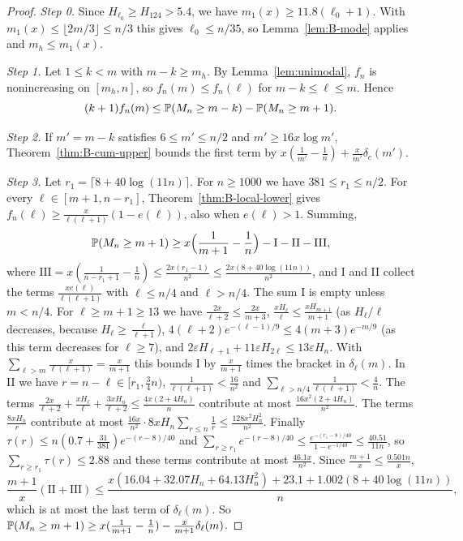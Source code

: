 \begin{proof}
\emph{Step 0.} Since $H_{\ell_0}\ge H_{124}>5.4$, we have
$m_1(x)\ge11.8(\ell_0+1)$. With $m_1(x)\le\lfloor2m/3\rfloor\le n/3$ this
gives $\ell_0\le n/35$, so Lemma~\ref{lem:B-mode} applies and
$m_h\le m_1(x)$.

\emph{Step 1.} Let $1\le k<m$ with $m-k\ge m_h$. By Lemma~\ref{lem:unimodal},
$f_n$ is nonincreasing on $[m_h,n]$, so $f_n(m)\le f_n(\ell)$ for
$m-k\le\ell\le m$. Hence
\[
 (k+1)f_n(m)\le\mathbb{P}(M_n\ge m-k)-\mathbb{P}(M_n\ge m+1).
\]

\emph{Step 2.} If $m'=m-k$ satisfies $6\le m'\le n/2$ and
$m'\ge16x\log m'$, Theorem~\ref{thm:B-cum-upper} bounds the first term by
$x(\frac1{m'}-\frac1n)+\frac x{m'}\delta_c(m')$.

\emph{Step 3.} Let $r_1=\lceil8+40\log(11n)\rceil$. For $n\ge1000$ we have
$381\le r_1\le n/2$. For every $\ell\in[m+1,n-r_1]$,
Theorem~\ref{thm:B-local-lower} gives $f_n(\ell)\ge\frac{x}{\ell(\ell+1)}(1-e(\ell))$,
also when $e(\ell)>1$. Summing,
\[
 \mathbb{P}(M_n\ge m+1)\ge x\Bigl(\frac1{m+1}-\frac1n\Bigr)-\mathrm{I}-\mathrm{II}-\mathrm{III},
\]
where $\mathrm{III}=x(\frac1{n-r_1+1}-\frac1n)\le\frac{2x(r_1-1)}{n^2}\le\frac{2x(8+40\log(11n))}{n^2}$,
and I and II collect the terms $\frac{xe(\ell)}{\ell(\ell+1)}$ with
$\ell\le n/4$ and $\ell>n/4$. The sum I is empty unless $m<n/4$. For
$\ell\ge m+1\ge13$ we have $\frac{2x}{\ell+2}\le\frac{2x}{m+3}$,
$\frac{xH_\ell}\ell\le\frac{xH_{m+1}}{m+1}$ (as $H_\ell/\ell$ decreases,
because $H_\ell\ge\frac\ell{\ell+1}$), $4(\ell+2)e^{-(\ell-1)/9}\le4(m+3)e^{-m/9}$
(as this term decreases for $\ell\ge7$), and
$2\varepsilon H_{\ell+1}+11\varepsilon H_{2\ell}\le13\varepsilon H_n$. With
$\sum_{\ell>m}\frac x{\ell(\ell+1)}=\frac x{m+1}$ this bounds I by
$\frac x{m+1}$ times the bracket in $\delta_\ell(m)$. In II we have
$r=n-\ell\in[r_1,\frac34n)$, $\frac1{\ell(\ell+1)}<\frac{16}{n^2}$ and
$\sum_{\ell>n/4}\frac1{\ell(\ell+1)}<\frac4n$. The terms
$\frac{2x}{\ell+2}+\frac{xH_\ell}\ell+\frac{3xH_n}{\ell+2}\le\frac{4x(2+4H_n)}n$
contribute at most $\frac{16x^2(2+4H_n)}{n^2}$. The terms $\frac{8xH_n}r$
contribute at most $\frac{16x}{n^2}\cdot8xH_n\sum_{r\le n}\frac1r\le\frac{128x^2H_n^2}{n^2}$.
Finally $\tau(r)\le n(0.7+\frac{31}{381})e^{-(r-8)/40}$ and
$\sum_{r\ge r_1}e^{-(r-8)/40}\le\frac{e^{-(r_1-8)/40}}{1-e^{-1/40}}\le\frac{40.51}{11n}$,
so $\sum_{r\ge r_1}\tau(r)\le2.88$ and these terms contribute at most
$\frac{46.1x}{n^2}$. Since $\frac{m+1}x\le\frac{0.501n}x$,
\[
 \frac{m+1}x(\mathrm{II}+\mathrm{III})
 \le\frac{x(16.04+32.07H_n+64.13H_n^2)+23.1+1.002(8+40\log(11n))}n,
\]
which is at most the last term of $\delta_\ell(m)$. So
$\mathbb{P}(M_n\ge m+1)\ge x(\frac1{m+1}-\frac1n)-\frac x{m+1}\delta_\ell(m)$.


\end{proof}
